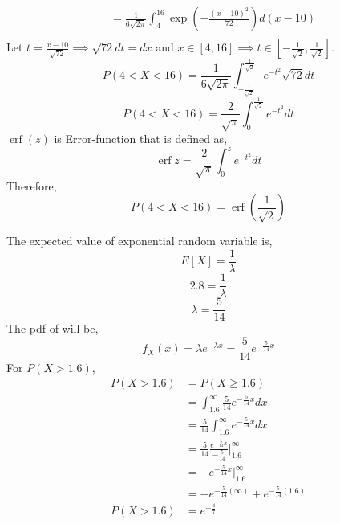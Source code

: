 \documentclass[answers]{exam}
\begin{document}
\begin{questions}
\begin{framed}
\begin{equation*}
\begin{split}
                & = \frac{1}{6\sqrt{2\pi}}\int_{4}^{16}\exp\left(-\frac{(x-10)^2}{72}\right)d(x-10)\\
            \end{split}
        \end{equation*}
        Let $t=\frac{x-10}{\sqrt{72}}\implies \sqrt{72}dt=dx$ and $x\in[4,16]\implies t\in[-\frac{1}{\sqrt{2}},\frac{1}{\sqrt{2}}]$.
        \[P(4<X<16)=\frac{1}{6\sqrt{2\pi}}\int_{-\frac{1}{\sqrt{2}}}^{\frac{1}{\sqrt{2}}}e^{-t^2}\sqrt{72}dt\]
        \[P(4<X<16)=\frac{2}{\sqrt{\pi}}\int_{0}^{\frac{1}{\sqrt{2}}}e^{-t^2}dt\]
        $\operatorname{erf}(z)$ is Error-function that is defined as,
        \[\operatorname {erf} z={\frac {2}{\sqrt {\pi }}}\int _{0}^{z}e^{-t^{2}}dt\]
        Therefore,
        \[P(4<X<16)=\operatorname{erf}\left(\frac{1}{\sqrt{2}}\right)\]
    \end{framed}

    \break

    \begin{framed}
        The expected value of exponential random variable is,
        \[E[X]=\frac{1}{\lambda}\]
        \[2.8=\frac{1}{\lambda}\]
        \[\lambda=\frac{5}{14}\]
        The pdf of will be,
        \[f_{X}(x)=\lambda e^{-\lambda x}=\frac{5}{14} e^{-\frac{5}{14} x}\]
        For $P(X > 1.6)$,
        \begin{equation*}
            \begin{split}
                P(X > 1.6) & = P(X \ge 1.6)\\
                & = \int_{1.6}^{\infty}\frac{5}{14} e^{-\frac{5}{14} x}dx\\
                & = \frac{5}{14} \int_{1.6}^{\infty}e^{-\frac{5}{14} x}dx\\
                & = \frac{5}{14}\frac{e^{-\frac{5}{14} x}}{-\frac{5}{14}}\bigg|_{1.6}^{\infty}\\
                & = -e^{-\frac{5}{14} x}\bigg|_{1.6}^{\infty}\\
                & = -e^{-\frac{5}{14} (\infty)}+e^{-\frac{5}{14} (1.6)}\\
                P(X > 1.6) & = e^{-\frac{4}{7}}
            \end{split}
        \end{equation*}
    \end{framed}


\end{questions}


\noindent \hrulefill
\end{document}
